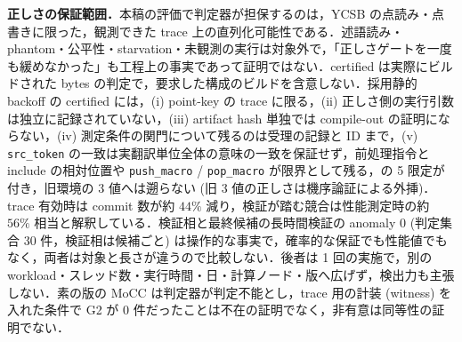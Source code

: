 \documentclass[submit,techrep,noauthor]{ipsj}
\begin{document}
\textbf{正しさの保証範囲．}本稿の評価で判定器が担保するのは，YCSB の点読み・点書きに限った，観測できた trace 上の直列化可能性である．述語読み・phantom・公平性・starvation・未観測の実行は対象外で，「正しさゲートを一度も緩めなかった」も工程上の事実であって証明ではない．certified は実際にビルドされた bytes の判定で，要求した構成のビルドを含意しない．採用静的 backoff の certified には，(i) point-key の trace に限る，(ii) 正しさ側の実行引数は独立に記録されていない，(iii) artifact hash 単独では compile-out の証明にならない，(iv) 測定条件の関門について残るのは受理の記録と ID まで，(v) \texttt{src\_token} の一致は実翻訳単位全体の意味の一致を保証せず，前処理指令と include の相対位置や \texttt{push\_macro} / \texttt{pop\_macro} が限界として残る，の 5 限定が付き，旧環境の 3 値へは遡らない (旧 3 値の正しさは機序論証による外挿)．trace 有効時は commit 数が約 $44\%$ 減り，検証が踏む競合は性能測定時の約 $56\%$ 相当と解釈している．検証相と最終候補の長時間検証の anomaly 0 (判定集合 30 件，検証相は候補ごと) は操作的な事実で，確率的な保証でも性能値でもなく，両者は対象と長さが違うので比較しない．後者は 1 回の実施で，別の workload・スレッド数・実行時間・日・計算ノード・版へ広げず，検出力も主張しない．素の版の MoCC は判定器が判定不能とし，trace 用の計装 (witness) を入れた条件で G2 が 0 件だったことは不在の証明でなく，非有意は同等性の証明でない．
\end{document}
